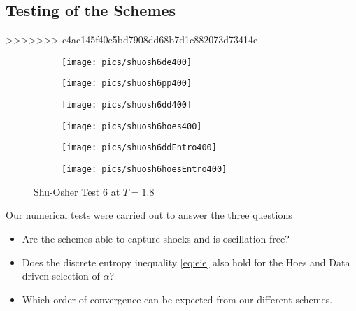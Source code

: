 	\subsection{Testing of the Schemes}
>>>>>>> c4ac145f40e5bd7908dd68b7d1c882073d73414e
	\begin{figure}
		\begin{subfigure}{0.48\textwidth}
			\texttt{[image: pics/shuosh6de400]}
		\end{subfigure}
		\begin{subfigure}{0.48\textwidth}
			\texttt{[image: pics/shuosh6pp400]}
		\end{subfigure}
		\begin{subfigure}{0.48\textwidth}
			\texttt{[image: pics/shuosh6dd400]}
		\end{subfigure}
		\begin{subfigure}{0.48\textwidth}
			\texttt{[image: pics/shuosh6hoes400]}
		\end{subfigure}
		\begin{subfigure}{0.48\textwidth}
			\texttt{[image: pics/shuosh6ddEntro400]}
		\end{subfigure}
		\begin{subfigure}{0.48\textwidth}
			\texttt{[image: pics/shuosh6hoesEntro400]}
		\end{subfigure}
		\caption{Shu-Osher Test 6 at $T = 1.8$}
		\label{fig:SO6}
	\end{figure}
	Our numerical tests were carried out to answer the three questions
	\begin{itemize}
		\item Are the schemes able to capture shocks and is oscillation free?
		\item Does the discrete entropy inequality \ref{eq:eie} also hold for the Hoes and Data driven selection of $\alpha$? 
		\item Which order of convergence can be expected from our different schemes. 
	\end{itemize}
